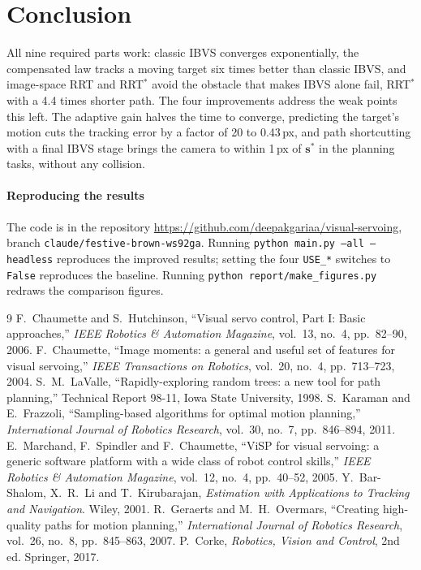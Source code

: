 \documentclass[11pt,a4paper]{article}
\newcommand{\vect}[1]{\bm{#1}}
\begin{document}
\section{Conclusion}

All nine required parts work: classic IBVS converges exponentially, the compensated law tracks a moving
target six times better than classic IBVS, and image-space RRT and RRT$^{*}$ avoid the obstacle that
makes IBVS alone fail, RRT$^{*}$ with a 4.4 times shorter path. The four improvements address the weak
points this left. The adaptive gain halves the time to converge, predicting the target's motion cuts
the tracking error by a factor of 20 to 0.43\,px, and path shortcutting with a final IBVS stage brings
the camera to within 1\,px of $\vect s^{*}$ in the planning tasks, without any collision.

\paragraph{Reproducing the results} The code is in the repository
\url{https://github.com/deepakgariaa/visual-servoing}, branch
\texttt{claude/festive-brown-ws92ga}.
Running \texttt{python main.py --all --headless} reproduces the improved results; setting the four
\texttt{USE\_*} switches to \texttt{False} reproduces the baseline. Running
\texttt{python report/make\_figures.py} redraws the comparison figures.


\begin{thebibliography}{9}\small
{} F.~Chaumette and S.~Hutchinson, ``Visual servo control, Part I: Basic approaches,''
  \emph{IEEE Robotics \& Automation Magazine}, vol.~13, no.~4, pp.~82--90, 2006.
 F.~Chaumette, ``Image moments: a general and useful set of features for visual servoing,''
  \emph{IEEE Transactions on Robotics}, vol.~20, no.~4, pp.~713--723, 2004.
 S.~M.~LaValle, ``Rapidly-exploring random trees: a new tool for path planning,''
  Technical Report 98-11, Iowa State University, 1998.
 S.~Karaman and E.~Frazzoli, ``Sampling-based algorithms for optimal motion planning,''
  \emph{International Journal of Robotics Research}, vol.~30, no.~7, pp.~846--894, 2011.
 E.~Marchand, F.~Spindler and F.~Chaumette, ``ViSP for visual servoing: a generic software
  platform with a wide class of robot control skills,'' \emph{IEEE Robotics \& Automation Magazine},
  vol.~12, no.~4, pp.~40--52, 2005.
 Y.~Bar-Shalom, X.~R.~Li and T.~Kirubarajan, \emph{Estimation with Applications to
  Tracking and Navigation}. Wiley, 2001.
 R.~Geraerts and M.~H.~Overmars, ``Creating high-quality paths for motion planning,''
  \emph{International Journal of Robotics Research}, vol.~26, no.~8, pp.~845--863, 2007.
 P.~Corke, \emph{Robotics, Vision and Control}, 2nd ed. Springer, 2017.
\end{thebibliography}
\end{document}
